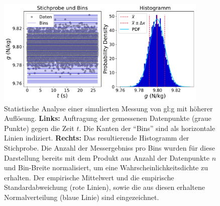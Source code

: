 \begin{figure}[H]
\centering
\includegraphics[width=0.9\textwidth]{Figures/messfehler2.pdf}
\caption{Statistische Analyse einer simulierten Messung von \gls{gl:g} mit höherer Auflösung. \textbf{Links:} Auftragung der gemessenen Datenpunkte (graue Punkte) gegen die Zeit $t$. Die Kanten der ``Bins'' sind als horizontale Linien indiziert.   \textbf{Rechts:} Das resultierende Histogramm der Stichprobe. Die Anzahl der Messergebniss pro Bins wurden für diese Darstellung bereits mit dem Produkt aus Anzahl der Datenpunkte $n$ und Bin-Breite normalisiert, um eine Wahrscheinlichkeitsdichte zu erhalten. Der empirische Mittelwert und die empirische Standardabweichung (rote Linien), sowie die aus diesen erhaltene Normalverteilung (blaue Linie) sind eingezeichnet.}
\label{fig:messfehler2}
\end{figure}


